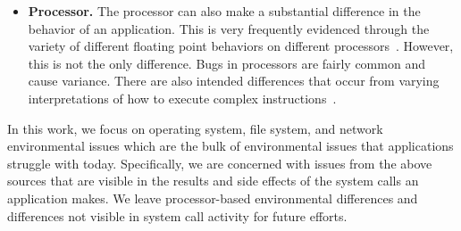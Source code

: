 \begin{itemize}
\item {\bf Processor.}  The processor can also make a substantial
difference in the behavior of an application.  This is very frequently
evidenced through the variety of different floating point behaviors on
different processors~\cite{ArbitraryPrecision}.  However, this is not the
only difference.  Bugs in processors are fairly common and cause variance.
There are also intended differences that occur from varying interpretations
of how to execute complex instructions~\cite{Microarch}.

\end{itemize}

In this work, we focus on operating system, file system, and network
environmental issues which are the bulk of environmental issues that
applications struggle with today. Specifically, we are concerned with
issues from the above sources that are visible in the results and side
effects of the system calls an application makes.  We leave processor-based
environmental differences and differences not visible in system call
activity for future efforts.
